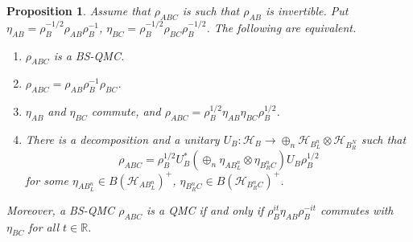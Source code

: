 \documentclass[12pt]{article}
\newtheorem{prop}{Proposition}
\theoremstyle{definition}
\theoremstyle{remark}
\def\Ha{\mathcal H}
\begin{document}
\begin{prop}\label{prop:BS_QMS} Assume that $\rho_{ABC}$ is such that $\rho_{AB}$ is
invertible. Put $\eta_{AB}=\rho_B^{-1/2}\rho_{AB}\rho_B^{-1}$,
$\eta_{BC}=\rho_B^{-1/2}\rho_{BC}\rho_B^{-1/2}$. The following are equivalent.

\begin{enumerate}
\item[(i)] $\rho_{ABC}$ is a BS-QMC.
\item[(ii)] $\rho_{ABC}=\rho_{AB}\rho_B^{-1}\rho_{BC}$.
\item[(iii)] $\eta_{AB}$ and $\eta_{BC}$ commute, and
$\rho_{ABC}=\rho_B^{1/2}\eta_{AB}\eta_{BC}\rho_{B}^{1/2}$.
\item[(iv)] There is a decomposition and a unitary $U_B:\Ha_B\to \oplus_n
\Ha_{B_L^n}\otimes \Ha_{B_R^N}$ such that 
\[
\rho_{ABC}=\rho_B^{1/2}U^*_B\left(\oplus_n \eta_{AB_{L}^n}\otimes
\eta_{B_R^nC}\right)U_B\rho_B^{1/2}
\]
for some $\eta_{AB_L^n}\in B(\Ha_{AB_L^n})^+$, $\eta_{B_R^nC}\in B(\Ha_{B_R^nC})^+$.

\end{enumerate}
Moreover, a BS-QMC $\rho_{ABC}$ is a QMC if and only if $\rho_B^{it}\eta_{AB}\rho_B^{-it}$
commutes with $\eta_{BC}$ for all $t\in \mathbb R$.




\end{prop}
\end{document}
